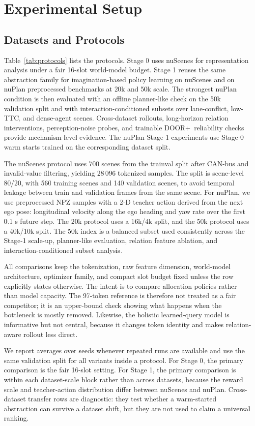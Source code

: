 \documentclass[10pt,journal,compsoc]{IEEEtran}
\newcommand{\doorplus}{\textsc{DOOR+}}
\begin{document}
\section{Experimental Setup}
\subsection{Datasets and Protocols}
Table~\ref{tab:protocols} lists the protocols. Stage 0 uses nuScenes for representation analysis under a fair 16-slot world-model budget. Stage 1 reuses the same abstraction family for imagination-based policy learning on nuScenes and on nuPlan preprocessed benchmarks at 20k and 50k scale. The strongest nuPlan condition is then evaluated with an offline planner-like check on the 50k validation split and with interaction-conditioned subsets over lane-conflict, low-TTC, and dense-agent scenes. Cross-dataset rollouts, long-horizon relation interventions, perception-noise probes, and trainable \doorplus\ reliability checks provide mechanism-level evidence. The nuPlan Stage-1 experiments use Stage-0 warm starts trained on the corresponding dataset split.

The nuScenes protocol uses 700 scenes from the trainval split after CAN-bus and invalid-value filtering, yielding 28\,096 tokenized samples. The split is scene-level 80/20, with 560 training scenes and 140 validation scenes, to avoid temporal leakage between train and validation frames from the same scene. For nuPlan, we use preprocessed NPZ samples with a 2-D teacher action derived from the next ego pose: longitudinal velocity along the ego heading and yaw rate over the first 0.1 s future step. The 20k protocol uses a 16k/4k split, and the 50k protocol uses a 40k/10k split. The 50k index is a balanced subset used consistently across the Stage-1 scale-up, planner-like evaluation, relation feature ablation, and interaction-conditioned subset analysis.

All comparisons keep the tokenization, raw feature dimension, world-model architecture, optimizer family, and compact slot budget fixed unless the row explicitly states otherwise. The intent is to compare allocation policies rather than model capacity. The 97-token reference is therefore not treated as a fair competitor; it is an upper-bound check showing what happens when the bottleneck is mostly removed. Likewise, the holistic learned-query model is informative but not central, because it changes token identity and makes relation-aware rollout less direct.

We report averages over seeds whenever repeated runs are available and use the same validation split for all variants inside a protocol. For Stage 0, the primary comparison is the fair 16-slot setting. For Stage 1, the primary comparison is within each dataset-scale block rather than across datasets, because the reward scale and teacher-action distribution differ between nuScenes and nuPlan. Cross-dataset transfer rows are diagnostic: they test whether a warm-started abstraction can survive a dataset shift, but they are not used to claim a universal ranking.
\end{document}
